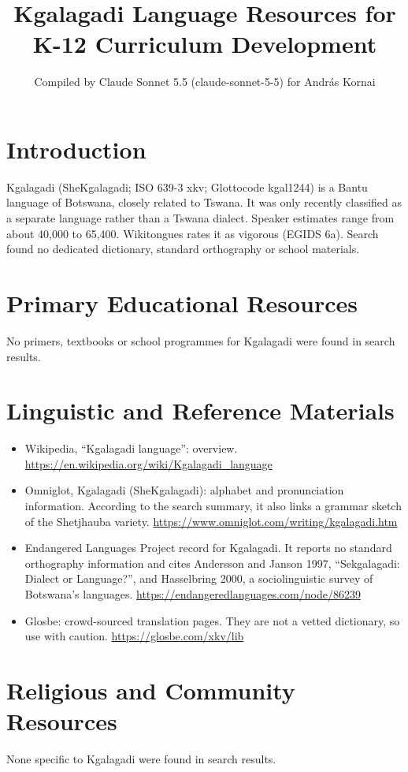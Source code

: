\documentclass[12pt]{article}
\title{Kgalagadi Language Resources for K-12 Curriculum Development}
\author{Compiled by Claude Sonnet 5.5 (claude-sonnet-5-5) for Andr\'as Kornai}
\date{}
\begin{document}
\maketitle

\section{Introduction}
Kgalagadi (SheKgalagadi; ISO 639-3 xkv; Glottocode kgal1244) is a Bantu language of Botswana, closely related to Tswana. It was only recently classified as a separate language rather than a Tswana dialect. Speaker estimates range from about 40,000 to 65,400. Wikitongues rates it as vigorous (EGIDS 6a). Search found no dedicated dictionary, standard orthography or school materials.

\section{Primary Educational Resources}
No primers, textbooks or school programmes for Kgalagadi were found in search results.

\section{Linguistic and Reference Materials}
\begin{itemize}
\item Wikipedia, ``Kgalagadi language'': overview. \url{https://en.wikipedia.org/wiki/Kgalagadi_language}
\item Omniglot, Kgalagadi (SheKgalagadi): alphabet and pronunciation information. According to the search summary, it also links a grammar sketch of the Shetjhauba variety. \url{https://www.omniglot.com/writing/kgalagadi.htm}
\item Endangered Languages Project record for Kgalagadi. It reports no standard orthography information and cites Andersson and Janson 1997, ``Sekgalagadi: Dialect or Language?'', and Hasselbring 2000, a sociolinguistic survey of Botswana's languages. \url{https://endangeredlanguages.com/node/86239}
\item Glosbe: crowd-sourced translation pages. They are not a vetted dictionary, so use with caution. \url{https://glosbe.com/xkv/lib}
\end{itemize}

\section{Religious and Community Resources}
None specific to Kgalagadi were found in search results.
\end{document}

